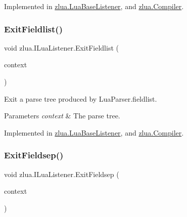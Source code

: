 Implemented in \mbox{\hyperlink{classzlua_1_1_lua_base_listener_a2c3ed58a89aca0feaf4e6fc1a74f5f2b}{zlua.\+Lua\+Base\+Listener}}, and \mbox{\hyperlink{classzlua_1_1_compiler_a169d31b8bd893ddc06b90184f76ecdc7}{zlua.\+Compiler}}.

\mbox{\label{interfacezlua_1_1_i_lua_listener_a8fbc0020ba9e41655757791877b61985}} 
\subsubsection{\texorpdfstring{Exit\+Fieldlist()}{ExitFieldlist()}}
{\footnotesize\ttfamily void zlua.\+I\+Lua\+Listener.\+Exit\+Fieldlist (\begin{DoxyParamCaption}\item[{\mbox{[}\+Not\+Null\mbox{]} \mbox{\hyperlink{classzlua_1_1_lua_parser_1_1_fieldlist_context}{Lua\+Parser.\+Fieldlist\+Context}}}]{context }\end{DoxyParamCaption})}



Exit a parse tree produced by Lua\+Parser.\+fieldlist. 


\begin{DoxyParams}{Parameters}
{\em context} & The parse tree.\\
\hline
\end{DoxyParams}


Implemented in \mbox{\hyperlink{classzlua_1_1_lua_base_listener_a44a0860d791e1bf2b19f911adf58ff72}{zlua.\+Lua\+Base\+Listener}}, and \mbox{\hyperlink{classzlua_1_1_compiler_abff740fa28ffb3a5dfd363aff46825b1}{zlua.\+Compiler}}.

\mbox{\label{interfacezlua_1_1_i_lua_listener_a3b2a4e6980def8cb07c26f52be3c22de}} 
\subsubsection{\texorpdfstring{Exit\+Fieldsep()}{ExitFieldsep()}}
{\footnotesize\ttfamily void zlua.\+I\+Lua\+Listener.\+Exit\+Fieldsep (\begin{DoxyParamCaption}\item[{\mbox{[}\+Not\+Null\mbox{]} \mbox{\hyperlink{classzlua_1_1_lua_parser_1_1_fieldsep_context}{Lua\+Parser.\+Fieldsep\+Context}}}]{context }\end{DoxyParamCaption})}



